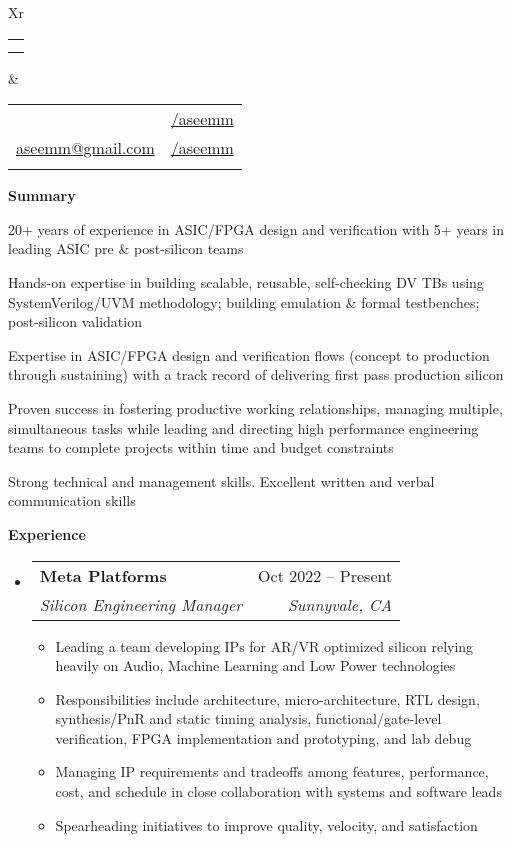 \documentclass[letterpaper,12pt]{article}[leftmargin=*]
\makeatletter
\def \fullname {Aseem Maheshwari}
\def \subtitle {}
\def \linkedinicon {\faLinkedin}
\def \linkedinlink {https://linkedin.com/in/aseemm/}
\def \linkedintext {/aseemm}
\def \phoneicon {\faPhone}
\def \phonetext {+1-510-516-1655}
\def \emailicon {\faEnvelope}
\def \emaillink {mailto:aseemm@gmail.com}
\def \emailtext {aseemm@gmail.com}
\def \githubicon {\faGithub}
\def \githublink {https://github.com/aseemm}
\def \githubtext {/aseemm}
\def \headertype {\doublecol} %
\def \entryspacing {-0pt}
\def \linkedin {\linkedinicon \hspace{3pt}\href{\linkedinlink}{\linkedintext}}
\def \phone {\phoneicon \hspace{3pt}{ \phonetext}}
\def \email {\emailicon \hspace{3pt}\href{\emaillink}{\emailtext}}
\def \github {\githubicon \hspace{3pt}\href{\githublink}{\githubtext}}
\renewcommand{\section}[2]{\vspace{5pt}
  \colorbox{secondary}{\color{white}\raggedbottom\normalsize\textbf{{#1}{\hspace{7pt}#2}}}
}
\newcommand{\resumeEntryStart}{\begin{itemize}[leftmargin=2.5mm]}
\newcommand{\resumeEntryEnd}{\end{itemize}\vspace{\entryspacing}}
\newcommand{\resumeItemListStart}{\begin{itemize}[leftmargin=4.5mm]}
\newcommand{\resumeItemListEnd}{\end{itemize}}
\newcommand{\resumeItem}[1]{
\item\small{
  {#1 \vspace{-2pt}}
}
}
\newcommand{\resumeEntryTSDL}[4]{
  \vspace{-1pt}\item[]
  \begin{tabularx}{0.97\textwidth}{X@{\hspace{60pt}}r}
    \textbf{\color{primary}#1} & {\firabook\color{accent}\small#2} \\
    \textit{\color{accent}\small#3} & \textit{\color{accent}\small#4} \\
  \end{tabularx}\vspace{-6pt}
}
\newcommand{\resumeEntrySummary}{
  \vspace{-1pt}\item[]
}
\newcommand{\doublecol}[6]{
  \begin{tabularx}{\textwidth}{Xr}
    {
      \begin{tabular}[c]{l}
        \fontsize{25}{35}\selectfont{\color{primary}{{\textbf{\fullname}}}} \\
                 {\textit{\subtitle}} %
      \end{tabular}
    } & {
      \begin{tabular}[c]{l@{\hspace{1.5em}}l}
        {\small#4} & {\small#1} \\
        {\small#5} & {\small#2} \\
        {\small#6} & {\small#3}
      \end{tabular}
    }
  \end{tabularx}
}
\newcommand{\singlecol}[6]{
  \begin{tabularx}{\textwidth}{Xr}
    {
      \begin{tabular}[b]{l}
        \fontsize{25}{35}\selectfont{\color{primary}{{\textbf{\fullname}}}} \\
                 {\textit{\subtitle}} %
      \end{tabular}
    } & {
      \begin{tabular}[c]{l}
        {\small#1} \\
        {\small#2} \\
        {\small#3} \\
        {\small#4} \\
        {\small#5} \\
        {\small#6}
      \end{tabular}
    }
  \end{tabularx}
}
\makeatother
\begin{document}



\headertype{\linkedin}{\github}{}{\phone}{\email}{} %
\vspace{-10pt} %

\section{\faBook}{Summary}

\resumeEntryStart
\resumeEntrySummary
    \resumeItemListStart
    \resumeItem {20+ years of experience in ASIC/FPGA design and verification with 5+ years in leading ASIC pre \& post-silicon teams}
 {}{    
    \resumeItem {Hands-on expertise in building scalable, reusable, self-checking DV TBs using SystemVerilog/UVM methodology; building emulation \& formal testbenches; post-silicon validation}
}
 {
    \resumeItem {Expertise in ASIC/FPGA design and verification flows (concept to production through sustaining) with a track record of delivering first pass production silicon}
}{}
    \resumeItem {Proven success in fostering productive working relationships, managing multiple, simultaneous tasks while leading and directing high performance engineering teams to complete projects within time and budget constraints}
    \resumeItem {Strong technical and management skills. Excellent written and verbal communication skills}
    \resumeItemListEnd
\resumeEntryEnd
    
\section{\faPieChart}{Experience}

\resumeEntryStart
\resumeEntryTSDL
   {Meta Platforms}{Oct 2022 -- Present}
   {Silicon Engineering Manager}{Sunnyvale, CA}
   \resumeItemListStart
   \resumeItem {Leading a team developing IPs for AR/VR optimized silicon relying heavily on Audio, Machine Learning and Low Power technologies} 
   \resumeItem {Responsibilities include architecture, micro-architecture, RTL design, synthesis/PnR and static timing analysis, functional/gate-level verification, FPGA implementation and prototyping, and lab debug}
   \resumeItem {Managing IP requirements and tradeoffs among features, performance, cost, and schedule in close collaboration with systems and software leads}
   \resumeItem {Spearheading initiatives to improve quality, velocity, and satisfaction}
   \resumeItemListEnd
\resumeEntryEnd
\end{document}
